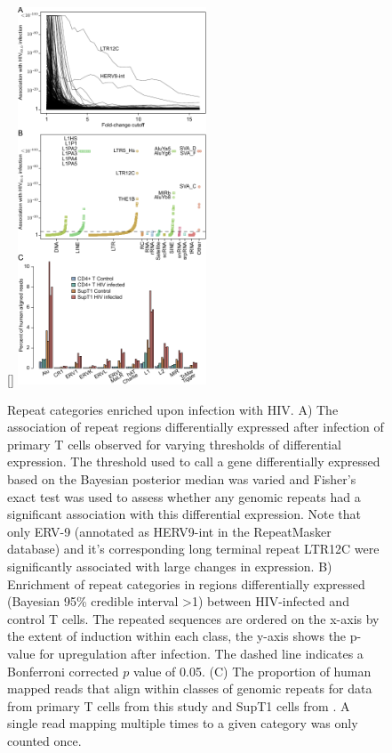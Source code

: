 \documentclass[../sherrill-Mix_thesis.tex]{subfiles}
\begin{document}
		\begin{figure}
			\centering
				[\FBwidth]{
					\includegraphics[width=0.5\textwidth]{ltrCombo.pdf}
				}{
					\caption[Repeat categories enriched upon infection with HIV]{Repeat categories enriched upon infection with HIV. A) The association of repeat regions differentially expressed after \hivEight{} infection of primary T cells observed for varying thresholds of differential expression. The threshold used to call a gene differentially expressed based on the Bayesian posterior median was varied and Fisher's exact test was used to assess whether any genomic repeats had a significant association with this differential expression. Note that only ERV-9 (annotated as HERV9-int in the RepeatMasker database) and it's corresponding long terminal repeat LTR12C were significantly associated with large changes in expression. B) Enrichment of repeat categories in regions differentially expressed (Bayesian 95\% credible interval \textgreater{}1) between HIV-infected and control \cdFour{} T cells. The repeated sequences are ordered on the x-axis by the extent of induction within each class, the y-axis shows the p-value for upregulation after infection. The dashed line indicates a Bonferroni corrected $p$ value of 0.05. (C) The proportion of human mapped reads that align within classes of genomic repeats for data from primary \cdFour{} T cells from this study and SupT1 cells from \citet{Chang2011}. A single read mapping multiple times to a given category was only counted once.}
					\label{figHervs}
				}
		\end{figure}
\end{document}
